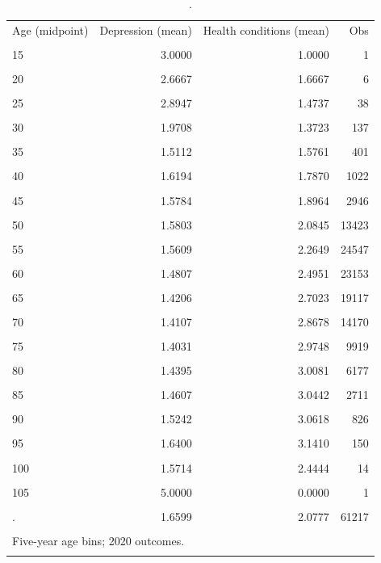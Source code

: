 \begin{table}[htbp]\centering
\caption{.}
\label{tab:depression_health_by_agegroup}
\begin{tabular}{lrrr}\toprule
Age (midpoint) & Depression (mean) & Health conditions (mean) & Obs \\\\ \midrule
15 & 3.0000 & 1.0000 & 1 \\\\
20 & 2.6667 & 1.6667 & 6 \\\\
25 & 2.8947 & 1.4737 & 38 \\\\
30 & 1.9708 & 1.3723 & 137 \\\\
35 & 1.5112 & 1.5761 & 401 \\\\
40 & 1.6194 & 1.7870 & 1022 \\\\
45 & 1.5784 & 1.8964 & 2946 \\\\
50 & 1.5803 & 2.0845 & 13423 \\\\
55 & 1.5609 & 2.2649 & 24547 \\\\
60 & 1.4807 & 2.4951 & 23153 \\\\
65 & 1.4206 & 2.7023 & 19117 \\\\
70 & 1.4107 & 2.8678 & 14170 \\\\
75 & 1.4031 & 2.9748 & 9919 \\\\
80 & 1.4395 & 3.0081 & 6177 \\\\
85 & 1.4607 & 3.0442 & 2711 \\\\
90 & 1.5242 & 3.0618 & 826 \\\\
95 & 1.6400 & 3.1410 & 150 \\\\
100 & 1.5714 & 2.4444 & 14 \\\\
105 & 5.0000 & 0.0000 & 1 \\\\
. & 1.6599 & 2.0777 & 61217 \\\\
\bottomrule
\multicolumn{4}{l}{\footnotesize Five-year age bins; 2020 outcomes.} \\\\
\end{tabular}\end{table}
